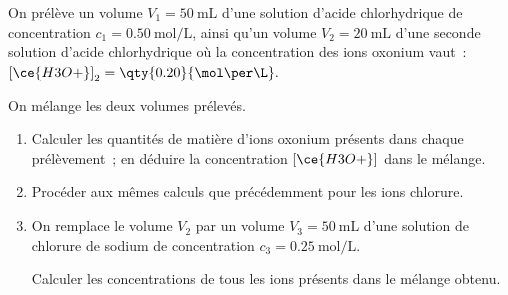 On prélève un volume $V_{1}=\qty{50}{\mL}$ d'une solution d'acide chlorhydrique
de concentration $c_{1}=\qty{0.50}{\mol\per\L}$, ainsi qu'un volume
$V_{2}=\qty{20}{\mL}$ d'une seconde solution d'acide chlorhydrique où la
concentration des ions oxonium vaut~:
$\left[\ce{H3O+}\right]_{2}=\qty{0.20}{\mol\per\L}.$

On mélange les deux volumes prélevés.
\begin{enumerate}
    \item Calculer les quantités de matière d'ions oxonium présents dans chaque
          prélèvement~; en déduire la concentration $\left[\ce{H3O+}\right]$
          dans le mélange.
    \item Procéder aux mêmes calculs que précédemment pour les ions chlorure.
    \item On remplace le volume $V_{2}$ par un volume $V_{3}=\qty{50}{\mL}$
          d'une solution de chlorure de sodium de concentration
          $c_{3}=\qty{0.25}{\mol\per\L}$.
    
          Calculer les concentrations de tous les ions présents dans le mélange
          obtenu.
\end{enumerate}


